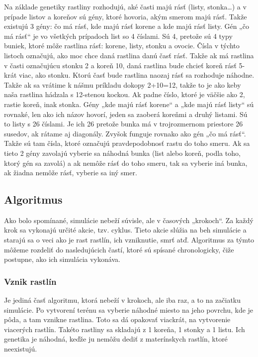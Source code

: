 \documentclass[12pt]{article}
\begin{document}
Na základe genetiky rastliny rozhodujú, aké časti majú rásť (listy, stonka…)
a v prípade listov a koreňov sú gény, ktoré hovoria, akým smerom majú rásť.
Takže existujú 3 gény: čo má rásť, kde majú rásť korene a kde majú rásť listy.
Gén „čo má rásť“ je vo všetkých prípadoch list so 4 číslami. Sú 4, pretože sú 4
typy buniek, ktoré môže rastlina rásť: korene, listy, stonku a ovocie. Čísla
v týchto listoch označujú, ako moc chce daná rastlina danú časť rásť. Takže
ak má rastlina v časti označujúcu stonku 2 a koreň 10, daná rastlina bude
chcieť koreň rásť 5-krát viac, ako stonku. Ktorú časť bude rastlina naozaj
rásť sa rozhoduje náhodne. Takže ak sa vrátime k nášmu príkladu dokopy 2+10=12,
takže to je ako keby naša rastlina hádzala s 12-stenou kockou. Ak padne číslo,
ktoré je väčšie ako 2, rastie koreň, inak stonka. Gény „kde majú rásť korene“
a „kde majú rásť listy“ sú rovnaké, len ako ich názov hovorí, jeden sa zaoberá
koreňmi a druhý listami. Sú to listy s 26 číslami. Je ich 26 pretože bunka má
v trojrozmernom priestore 26 susedov, ak rátame aj diagonály. Zvyšok funguje
rovnako ako gén „čo má rásť“. Takže sú tam čísla, ktoré označujú
pravdepodobnosť rastu do toho smeru. Ak sa tieto 2 gény zavolajú vyberie
sa náhodná bunka (list alebo koreň, podla toho, ktorý gén sa zavolá) a ak
nemôže rásť do toho smeru, tak sa vyberie iná bunka, ak žiadna nemôže rásť,
vyberie sa iný smer.

\subsection{Algoritmus}

Ako bolo spomínané, simulácie nebeží súvisle, ale v časových „krokoch“.
Za každý krok sa vykonajú určité akcie, tzv. cyklus. Tieto akcie slúžia na beh
simulácie a starajú sa o veci ako je rast rastlín, ich vzniknutie, smrť atď.
Algoritmus za týmto môžeme rozdeliť do nasledujúcich častí, ktoré sú spísané
chronologicky, čiže postupne, ako ich simulácia vykonáva.

\subsubsection{Vznik rastlín}

Je jediná časť algoritmu, ktorá nebeží v krokoch, ale iba raz, a to na začiatku
simulácie. Po vytvorení terénu sa vyberie náhodné miesto na jeho povrchu, kde
je pôda, a tam vznikne rastlina. Toto sa dá opakovať viackrát, na vytvorenie
viacerých rastlín. Takéto rastliny sa skladajú z 1 koreňa, 1 stonky a 1 listu.
Ich genetika je náhodná, keďže ju nemôžu dediť z materínskych rastlín, ktoré
neexistujú.
\end{document}
